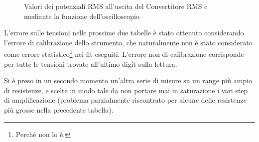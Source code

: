 \documentclass[a4paper,10pt]{article}
\begin{document}
\begin{table}[H]
	\centering
	
	\caption{Dati acquisiti per la risposta in frequenza della prima parte del preamplificatore.}
	\label{tab:prepreamp}
\end{table}

\begin{table}[H]
	\centering
	
	\caption{Dati acquisiti per la risposta in frequenza della seconda parte del preamplificatore.}
	\label{tab:postpreamp}
\end{table}

\begin{figure}
	\begin{minipage}{0.64\textwidth}
		\begin{table}[H]
			\centering
			
			\caption{Dati acquisiti per la risposta in frequenza del passabanda.}
			\label{tab:bandpass}
		\end{table}
	\end{minipage}
	\begin{minipage}{0.34\textwidth}
		\begin{table}[H]
			\centering
			
			\caption{Valori dei potenziali RMS all'uscita del Convertitore RMS e mediante la funzione dell'oscilloscopio}
			\label{tab:RMScal}
		\end{table}
	\end{minipage}
\end{figure}

\begin{table}[H]
	\centering
	
	\caption{Valori delle frequenze utilizzate e del potenziale in uscita al circuito utilizzando un partitore 1000:1.}
	\label{tab:totamp}
\end{table}

\pagebreak

L'errore sulle tensioni nelle prossime due tabelle è stato ottenuto considerando l'errore di calibrazione dello strumento, che naturalmente non è stato considerato come errore statistico\footnote{Perché non lo è.} nei fit eseguiti.
L'errore non di calibrazione corrisponde per tutte le tensioni trovate all'ultimo digit sulla lettura.

\begin{table}[H]
	\centering
	
	\caption{Valori delle resistenze utilizzate e del potenziale all'uscita del circuito (analisi preliminare).}
	\label{tab:lastfit}
\end{table}

Si è preso in un secondo momento un'altra serie di misure su un range più ampio di resistenze, e scelte in modo tale da non portare mai in saturazione i vari step di amplificazione (problema parzialmente riscontrato per alcune delle resistenze più grosse nella precedente tabella).

\begin{table}[H]
	\centering
	
	\caption{Valori delle resistenze utilizzate e del potenziale all'uscita del circuito (valori definitivi).}
	\label{tab:lastfit1}
\end{table}
\end{document}
